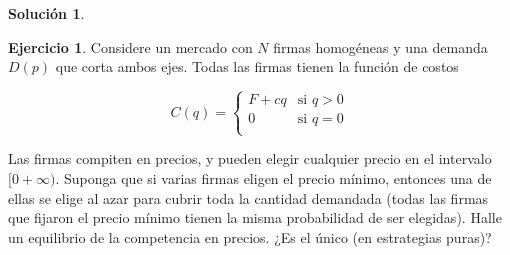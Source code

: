 \documentclass[a4paper, 11pt]{article}
\theoremstyle{definition}
\newtheorem{ejercicio}{Ejercicio}
\newtheorem{solucion}{Soluci\'on}
\begin{document}
\begin{solucion}
\begin{enumerate}
\begin{enumerate}
\end{enumerate}
\end{enumerate}
\end{solucion}

\begin{ejercicio} %
Considere un mercado con $N$ firmas homogéneas y una demanda $D(p)$ que corta ambos ejes. Todas las firmas tienen la función de costos

\vspace*{-20pt}

\[
C(q)=
\begin{cases}
F+cq & \text{si } q>0\\
0 & \text{si } q=0\\
\end{cases}
\]

Las firmas compiten en precios, y pueden elegir cualquier precio en el intervalo $[0 +\infty)$. Suponga que si varias firmas eligen el precio mínimo, entonces una de ellas se elige al azar para cubrir toda la cantidad demandada (todas las firmas que fijaron el precio mínimo tienen la misma
probabilidad de ser elegidas). Halle un equilibrio de la competencia en precios. ¿Es el único (en estrategias puras)?
\end{ejercicio}
\end{document}
